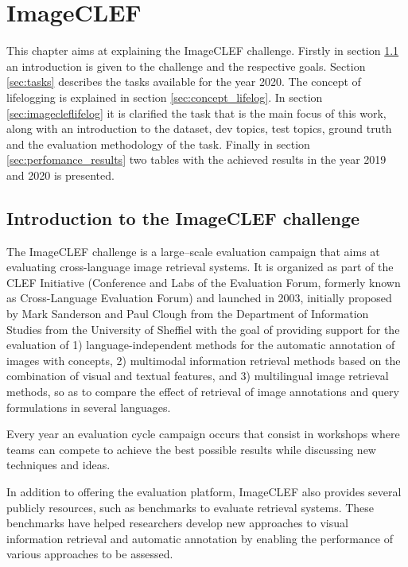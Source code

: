 \cleardoublepage

\chapter{ImageCLEF}
\label{ch:imageclef}

This chapter aims at explaining the ImageCLEF challenge. Firstly in section \ref{sec:introduct} an introduction is given to the challenge and the respective goals. Section \ref{sec:tasks} describes the tasks available for the year 2020. The concept of lifelogging is explained in section \ref{sec:concept_lifelog}. In section \ref{sec:imagecleflifelog} it is clarified the task that is the main focus of this work, along with an introduction to the dataset, dev topics, test topics, ground truth and the evaluation methodology of the task. Finally in section \ref{sec:perfomance_results} two tables with the achieved results in the year 2019 and 2020 is presented.



\section{Introduction to the ImageCLEF challenge}
\label{sec:introduct}

The ImageCLEF challenge is a large–scale evaluation campaign that aims at evaluating cross-language image retrieval systems. It is organized as part of the CLEF Initiative (Conference and Labs of the Evaluation Forum, formerly known as Cross-Language Evaluation Forum) and launched in  2003, initially proposed by Mark Sanderson and Paul Clough from the Department of Information Studies from the University of Sheffiel with the goal of providing support for the evaluation of 1) language-independent methods for the automatic annotation of images with concepts, 2) multimodal information retrieval methods based on the combination of visual and textual features, and 3) multilingual image retrieval methods, so as to compare the effect of retrieval of image annotations and query formulations in several languages.


Every year an evaluation cycle campaign occurs that consist in workshops where teams can compete to achieve the best possible results while discussing new techniques and ideas. 

In addition to offering the evaluation platform, ImageCLEF also provides several publicly resources, such as benchmarks to evaluate retrieval systems. These benchmarks have helped researchers develop new approaches to visual information retrieval and automatic annotation by enabling the performance of various approaches to be assessed.

